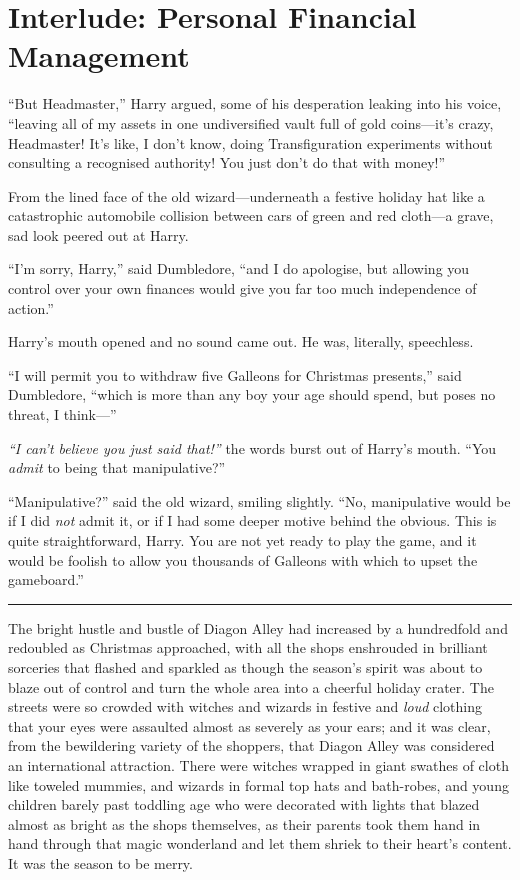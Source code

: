 \chapter{Interlude: Personal Financial
Management}\label{interlude-personal-financial-management}

``But Headmaster,'' Harry argued, some of his desperation leaking into
his voice, ``leaving all of my assets in one undiversified vault full of
gold coins---it's crazy, Headmaster! It's like, I don't know, doing
Transfiguration experiments without consulting a recognised authority!
You just don't do that with money!''

From the lined face of the old wizard---underneath a festive holiday hat
like a catastrophic automobile collision between cars of green and red
cloth---a grave, sad look peered out at Harry.

``I'm sorry, Harry,'' said Dumbledore, ``and I do apologise, but
allowing you control over your own finances would give you far too much
independence of action.''

Harry's mouth opened and no sound came out. He was, literally,
speechless.

``I will permit you to withdraw five Galleons for Christmas presents,''
said Dumbledore, ``which is more than any boy your age should spend, but
poses no threat, I think---''

\emph{``I can't believe you just said that!''} the words burst out of
Harry's mouth. ``You \emph{admit} to being that manipulative?''

``Manipulative?'' said the old wizard, smiling slightly. ``No,
manipulative would be if I did \emph{not} admit it, or if I had some
deeper motive behind the obvious. This is quite straightforward, Harry.
You are not yet ready to play the game, and it would be foolish to allow
you thousands of Galleons with which to upset the gameboard.''

\begin{center}\rule{3in}{0.4pt}\end{center}

The bright hustle and bustle of Diagon Alley had increased by a
hundredfold and redoubled as Christmas approached, with all the shops
enshrouded in brilliant sorceries that flashed and sparkled as though
the season's spirit was about to blaze out of control and turn the whole
area into a cheerful holiday crater. The streets were so crowded with
witches and wizards in festive and \emph{loud} clothing that your eyes
were assaulted almost as severely as your ears; and it was clear, from
the bewildering variety of the shoppers, that Diagon Alley was
considered an international attraction. There were witches wrapped in
giant swathes of cloth like toweled mummies, and wizards in formal top
hats and bath-robes, and young children barely past toddling age who
were decorated with lights that blazed almost as bright as the shops
themselves, as their parents took them hand in hand through that magic
wonderland and let them shriek to their heart's content. It was the
season to be merry.


